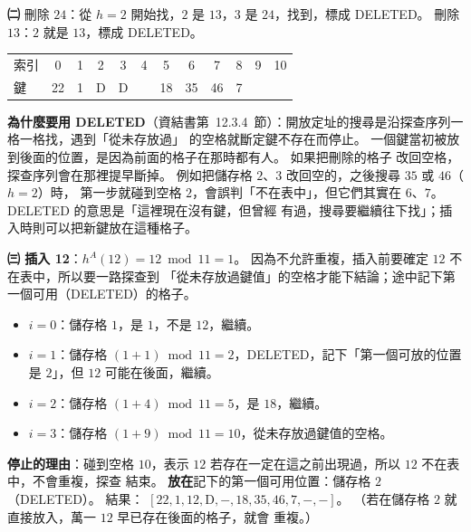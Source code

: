 \begin{pastsoln}
\textbf{㈡} 刪除 $24$：從 $h = 2$ 開始找，$2$ 是 $13$，$3$ 是 $24$，找到，標成 DELETED。 刪除 $13$：$2$ 就是
$13$，標成 DELETED。
\begin{center}
\small
\begin{tabular}{l*{11}{|c}|}
索引 & 0 & 1 & 2 & 3 & 4 & 5 & 6 & 7 & 8 & 9 & 10 \\ 
鍵 & 22 & 1 & D & D & & 18 & 35 & 46 & 7 & & \\ 
\end{tabular}
\end{center}
\textbf{為什麼要用 DELETED}（資結書第~12.3.4~節）：開放定址的搜尋是沿探查序列一格一格找，遇到「從未存放過」
的空格就斷定鍵不存在而停止。 一個鍵當初被放到後面的位置，是因為前面的格子在那時都有人。 如果把刪除的格子
改回空格，探查序列會在那裡提早斷掉。 例如把儲存格 $2$、$3$ 改回空的，之後搜尋 $35$ 或 $46$（$h = 2$）時，
第一步就碰到空格 $2$，會誤判「不在表中」，但它們其實在 $6$、$7$。 DELETED 的意思是「這裡現在沒有鍵，但曾經
有過，搜尋要繼續往下找」；插入時則可以把新鍵放在這種格子。

\textbf{㈢ 插入 12}：$h^A(12) = 12 \bmod 11 = 1$。 因為不允許重複，插入前要確定 $12$ 不在表中，所以要一路探查到
「從未存放過鍵值」的空格才能下結論；途中記下第一個可用（DELETED）的格子。
\begin{itemize}
\item $i = 0$：儲存格 $1$，是 $1$，不是 $12$，繼續。
\item $i = 1$：儲存格 $(1 + 1) \bmod 11 = 2$，DELETED，記下「第一個可放的位置是 $2$」，但 $12$ 可能在後面，繼續。
\item $i = 2$：儲存格 $(1 + 4) \bmod 11 = 5$，是 $18$，繼續。
\item $i = 3$：儲存格 $(1 + 9) \bmod 11 = 10$，從未存放過鍵值的空格。
\end{itemize}
\textbf{停止的理由}：碰到空格 $10$，表示 $12$ 若存在一定在這之前出現過，所以 $12$ 不在表中，不會重複，探查
結束。 \textbf{放在}記下的第一個可用位置：儲存格 $2$（DELETED）。 結果：
$[22, 1, 12, \text{D}, -, 18, 35, 46, 7, -, -]$。 （若在儲存格 $2$ 就直接放入，萬一 $12$ 早已存在後面的格子，就會
重複。）


\end{pastsoln}
